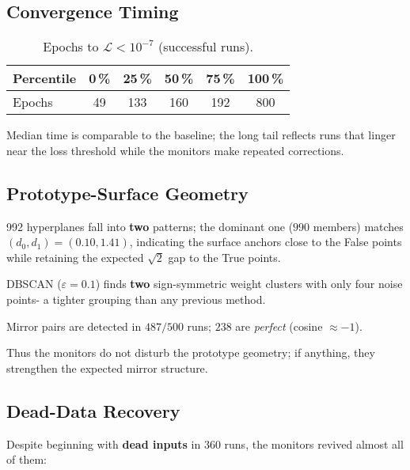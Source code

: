 \subsection*{Convergence Timing}

\begin{table}[h]
\centering
\caption{Epochs to $\mathcal L<10^{-7}$ (successful runs).}
\label{tab:relu1-monitor-epochs}
\begin{tabular}{lccccc}
\toprule
Percentile & 0\,\% & 25\,\% & 50\,\% & 75\,\% & 100\,\% \\ \midrule
Epochs & 49 & 133 & 160 & 192 & 800 \\
\bottomrule
\end{tabular}
\end{table}

Median time is comparable to the baseline; the long tail reflects runs
that linger near the loss threshold while the monitors make repeated
corrections.

\subsection*{Prototype-Surface Geometry}

\begin{description}[leftmargin=2em]
  \item[Distance clusters]
        992 hyperplanes fall into \textbf{two} patterns; the dominant
        one ($990$ members) matches $(d_{0},d_{1})\!=\!(0.10,1.41)$,
        indicating the surface anchors close to the False points while
        retaining the expected $\sqrt2$ gap to the True points.
  \item[Weight clusters]
        DBSCAN ($\varepsilon=0.1$) finds \textbf{two} sign-symmetric
        weight clusters with only four noise points-
        a tighter grouping than any previous method.
  \item[Mirror symmetry]
        Mirror pairs are detected in $487/500$ runs; $238$ are
        \emph{perfect} (cosine $\approx-1$).
\end{description}

Thus the monitors do not disturb the prototype geometry; if anything,
they strengthen the expected mirror structure.

\subsection*{Dead-Data Recovery}
Despite beginning with \textbf{dead inputs} in 360 runs, the monitors
revived almost all of them:

